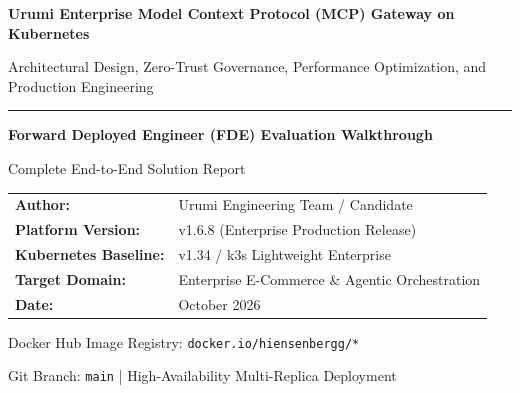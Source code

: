 \documentclass[11pt,a4paper]{article}
\begin{document}
\begin{titlepage}
    \centering
    \vspace*{1.5cm}
    
    {\Huge \bfseries \color{primary} Urumi Enterprise Model Context Protocol (MCP) Gateway on Kubernetes \par}
    \vspace{0.8cm}
    {\LARGE \color{secondary} Architectural Design, Zero-Trust Governance, Performance Optimization, and Production Engineering \par}
    
    \vspace{1.5cm}
    \rule{0.8\textwidth}{1.5pt}
    \vspace{1.5cm}
    
    \textbf{\Large Forward Deployed Engineer (FDE) Evaluation Walkthrough} \par
    \vspace{0.5cm}
    {\large Complete End-to-End Solution Report \par}
    
    \vspace{2.5cm}
    
    \begin{tabular}{ll}
        \textbf{Author:} & Urumi Engineering Team / Candidate \\
        \textbf{Platform Version:} & v1.6.8 (Enterprise Production Release) \\
        \textbf{Kubernetes Baseline:} & v1.34 / k3s Lightweight Enterprise \\
        \textbf{Target Domain:} & Enterprise E-Commerce \& Agentic Orchestration \\
        \textbf{Date:} & October 2026 \\
    \end{tabular}
    
    \vfill
    
    {\small \color{darkgray} Docker Hub Image Registry: \texttt{docker.io/hiensenbergg/*} \par
    Git Branch: \texttt{main} | High-Availability Multi-Replica Deployment \par}
    
\end{titlepage}

\newpage
{}
\end{document}
